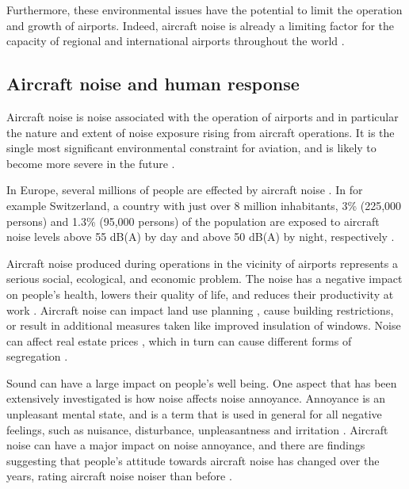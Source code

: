 Furthermore, these environmental issues have the potential to limit the
operation and growth of airports. Indeed, aircraft noise is already a limiting
factor for the capacity of regional and international airports throughout the
world \cite{Zaporozhets2011}.


\subsection{Aircraft noise and human response}
Aircraft noise is noise associated with the operation of airports and in
particular the nature and extent of noise exposure rising from aircraft
operations. It is the single most significant
environmental constraint for aviation, and is likely to become more severe in the future
\cite{Zaporozhets2011}. 

In Europe, several millions of people are effected by aircraft noise
\cite{MPDGroupLimited2007}. In for example Switzerland, a country with just over
8 million inhabitants, 3\% (225,000 persons) and 1.3\% (95,000 persons) of the
population are exposed to aircraft noise levels above 55 dB(A) by day and above
50 dB(A) by night, respectively \cite{Kirk2009,Schaffer2014}. 

Aircraft noise produced during operations in the vicinity of airports represents
a serious social, ecological, and economic problem. The noise has a negative
impact on people's health, lowers their quality of life, and reduces their
productivity at work \cite{Zaporozhets2011}. Aircraft noise can impact land use
planning \cite{Freestone2010}, cause building restrictions, or result
in additional measures taken like improved insulation of windows. Noise can
affect real estate prices \cite{Theebe2004}, which in turn can cause different
forms of segregation \cite{Bjornskau2005}.

Sound can have a large impact on people's well being. One aspect that has been
extensively investigated is how noise affects noise annoyance. Annoyance is an
unpleasant mental state, and is a term that is used in general for all negative
feelings, such as nuisance, disturbance, unpleasantness and irritation
\cite{Guski1999}. Aircraft noise can have a major impact on noise annoyance,
and there are findings suggesting that people's attitude towards aircraft noise
has changed over the years, rating aircraft noise noiser than before \cite{Babisch2009}.

